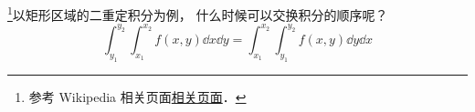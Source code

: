 
\footnote{参考 Wikipedia 相关页面\href{https://en.wikipedia.org/wiki/Fubini's_theorem}{相关页面}．}以矩形区域的二重定积分为例， 什么时候可以交换积分的顺序呢？
\begin{equation}
\int_{y_1}^{y_2}\int_{x_1}^{x_2} f(x, y) \dd{x} \dd{y} = \int_{x_1}^{x_2}\int_{y_1}^{y_2} f(x, y) \dd{y}\dd{x}
\end{equation}

